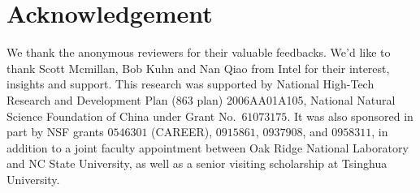 \section{Acknowledgement}
    We thank the anonymous reviewers for their valuable feedbacks. We'd like
    to thank Scott Mcmillan, Bob Kuhn and Nan Qiao from Intel for their
    interest, insights and support. This research was supported by National
    High-Tech Research and Development Plan (863 plan) 2006AA01A105, National
    Natural Science Foundation of China under Grant No.\ $61073175$. It was
    also sponsored in part by NSF grants $0546301$ (CAREER), $0915861$,
    $0937908$, and $0958311$, in addition to a joint faculty appointment
    between Oak Ridge National Laboratory and NC State University, as well as
    a senior visiting scholarship at Tsinghua University.
